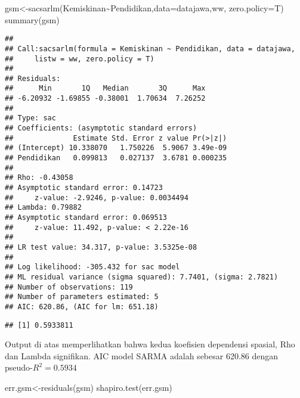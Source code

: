 \documentclass[
]{book}
\newenvironment{Shaded}{\begin{snugshade}}{\end{snugshade}}
\newcommand{\AttributeTok}[1]{\textcolor[rgb]{0.77,0.63,0.00}{#1}}
\newcommand{\DecValTok}[1]{\textcolor[rgb]{0.00,0.00,0.81}{#1}}
\newcommand{\FunctionTok}[1]{\textcolor[rgb]{0.00,0.00,0.00}{#1}}
\newcommand{\NormalTok}[1]{#1}
\newcommand{\OtherTok}[1]{\textcolor[rgb]{0.56,0.35,0.01}{#1}}
\newcommand{\SpecialCharTok}[1]{\textcolor[rgb]{0.00,0.00,0.00}{#1}}
\begin{document}
\begin{Shaded}
\begin{Highlighting}[]
\NormalTok{gsm}\OtherTok{\textless{}{-}}\FunctionTok{sacsarlm}\NormalTok{(Kemiskinan}\SpecialCharTok{\textasciitilde{}}\NormalTok{Pendidikan,}\AttributeTok{data=}\NormalTok{datajawa,ww, }\AttributeTok{zero.policy=}\NormalTok{T)}
\FunctionTok{summary}\NormalTok{(gsm)}
\end{Highlighting}
\end{Shaded}

\begin{verbatim}
## 
## Call:sacsarlm(formula = Kemiskinan ~ Pendidikan, data = datajawa, 
##     listw = ww, zero.policy = T)
## 
## Residuals:
##      Min       1Q   Median       3Q      Max 
## -6.20932 -1.69855 -0.38001  1.70634  7.26252 
## 
## Type: sac 
## Coefficients: (asymptotic standard errors) 
##              Estimate Std. Error z value Pr(>|z|)
## (Intercept) 10.338070   1.750226  5.9067 3.49e-09
## Pendidikan   0.099813   0.027137  3.6781 0.000235
## 
## Rho: -0.43058
## Asymptotic standard error: 0.14723
##     z-value: -2.9246, p-value: 0.0034494
## Lambda: 0.79882
## Asymptotic standard error: 0.069513
##     z-value: 11.492, p-value: < 2.22e-16
## 
## LR test value: 34.317, p-value: 3.5325e-08
## 
## Log likelihood: -305.432 for sac model
## ML residual variance (sigma squared): 7.7401, (sigma: 2.7821)
## Number of observations: 119 
## Number of parameters estimated: 5 
## AIC: 620.86, (AIC for lm: 651.18)
\end{verbatim}

\begin{Shaded}
\end{Shaded}

\begin{verbatim}
## [1] 0.5933811
\end{verbatim}

Output di atas memperlihatkan bahwa kedua koefisien dependensi spasial, Rho dan Lambda signifikan. AIC model SARMA adalah sebesar 620.86 dengan pseudo-\(R^2=0.5934\)

\begin{Shaded}
\begin{Highlighting}[]
\NormalTok{err.gsm}\OtherTok{\textless{}{-}}\FunctionTok{residuals}\NormalTok{(gsm)}
\FunctionTok{shapiro.test}\NormalTok{(err.gsm)}
\end{Highlighting}
\end{Shaded}
\end{document}
